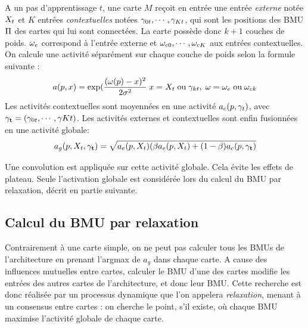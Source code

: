 A un pas d'apprentissage $t$, une carte $M$ reçoit en entrée une entrée \emph{externe} notée $X_t$ et $K$ entrées \emph{contextuelles} notées $\gamma_{0t},\cdots,\gamma_{Kt}$, qui sont les positions des BMU $\Pi$ des cartes qui lui sont connectées. La carte possède donc $k+1$ couches de poids. $\omega_e$ correspond à l'entrée externe et $\omega_{c0}, \cdots, \omega_{cK}$ aux entrées contextuelles. On calcule une activité séparément sur chaque couche de poids selon la formule suivante : 
\begin{equation}
\label{eq:activite}
a(p,x) = \exp(\frac{(\omega(p)-x)^2}{2\sigma^2} \; x = X_t\; \text{ou}\; \gamma_{kt}, \; \omega = \omega_e \;\text{ou}\; \omega_{ck}
\end{equation}
Les activités contextuelles sont moyennées en une activité $a_c(p,\mathbf{\gamma}_t)$, avec $\mathbf{\gamma_t} = (\gamma_{0t}, \cdots, \gamma{Kt})$. 
Les activités externes et contextuelles sont enfin fusionnées en une activité globale:
\begin{equation}
\label{eq:global_act}
a_g(p,X_t,\mathbf{\gamma_t}) = \sqrt{a_e(p,X_t)(\beta a_e(p,X_t) + (1-\beta) a_c(p, \mathbf{\gamma_t})}
\end{equation}

Une convolution est appliquée sur cette activité globale. Cela évite les effets de plateau. Seule l'activation globale est considérée lors du calcul du BMU par relaxation, décrit en partie suivante. 

\subsection{Calcul du BMU par relaxation}

Contrairement à une carte simple, on ne peut pas calculer tous les BMUs de l'architecture en prenant l'argmax de $a_g$ dans chaque carte. A cause des influences mutuelles entre cartes, calculer le BMU d'une des cartes modifie les entrées des autres cartes de l'architecture, et donc leur BMU. Cette recherche est donc réalisée par un processus dynamique que l'on appelera \emph{relaxation}, menant à un consensus entre cartes : on cherche le point, s'il existe, où chaque BMU maximise l'activité globale de chaque carte.

